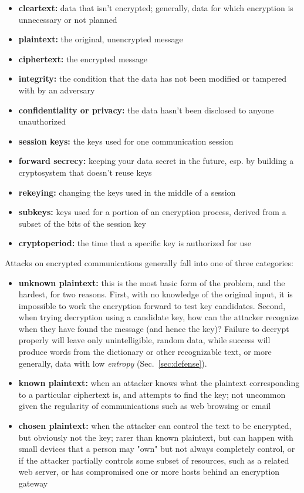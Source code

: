 \begin{itemize}
\item {\bf cleartext:} data that isn't encrypted; generally, data for
  which encryption is unnecessary or not planned
\item {\bf plaintext:} the original, unencrypted message
\item {\bf ciphertext:} the encrypted message
\item {\bf integrity:} the condition that the data has not been
  modified or tampered with by an adversary
\item {\bf confidentiality or privacy:} the data hasn't been disclosed to anyone unauthorized
\item {\bf session keys:} the keys used for one communication session
\item {\bf forward secrecy:} keeping your data secret in the future, esp. by
  building a cryptosystem that doesn't reuse keys
\item {\bf rekeying:} changing the keys used in the middle of a session
\item {\bf subkeys:} keys used for a portion of an encryption process, derived
  from a subset of the bits of the session key
\item {\bf cryptoperiod:} the time that a specific key is authorized for use
\end{itemize}

Attacks on encrypted communications generally fall into one of three
categories:

\begin{itemize}
\item {\bf unknown plaintext:} this is the most basic form of the
  problem, and the hardest, for two reasons.  First, with no knowledge
  of the original input, it is impossible to work the encryption
  forward to test key candidates.  Second, when trying decryption
  using a candidate key, how can the attacker recognize when they have
  found the message (and hence the key)?  Failure to decrypt properly
  will leave only unintelligible, random data, while success will
  produce words from the dictionary or other recognizable text, or
  more generally, data with low \emph{entropy} (Sec.~\ref{sec:defense}).
\item {\bf known plaintext:} when an attacker knows what the plaintext
  corresponding to a particular ciphertext is, and attempts to find
  the key; not uncommon given the regularity of communications such as
  web browsing or email
\item {\bf chosen plaintext:} when the attacker can control the text to be
  encrypted, but obviously not the key; rarer than known plaintext,
  but can happen with small devices that a person may "own" but not
  always completely control, or if the attacker partially controls
  some subset of resources, such as a related web server, or has
  compromised one or more hosts behind an encryption gateway
\end{itemize}

